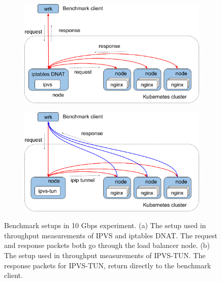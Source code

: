 \begin{figure}[h]
  \begin{subfigure}[t]{\columnwidth}
    \centering
    \includegraphics[width=0.8\columnwidth]{Figs/benchmark-schem-10g-nat}
    \par\bigskip
    \centering
    \begin{minipage}{0.9\columnwidth}
      \caption{}
      \label{fig:benchmark-schem-10g-nat}
    \end{minipage}
  \end{subfigure}

  \begin{subfigure}[t]{\columnwidth}
    \centering
    \includegraphics[width=0.8\columnwidth]{Figs/benchmark-schem-10g-dsr}
    \par\bigskip
    \centering
    \begin{minipage}{0.9\columnwidth}
      \caption{}
      \label{fig:benchmark-schem-10g-dsr}
    \end{minipage}
  \end{subfigure}

  \par\bigskip
  \centering
  \begin{minipage}{0.9\columnwidth}
    \caption[Benchmark setups in 10 Gbps experiment]{
      Benchmark setups in 10 Gbps experiment.
      (a) The setup used in throughput measurements of IPVS and iptables DNAT.
      The request and response packets both go through the load balancer node.
      (b) The setup used in throughput measurements of IPVS-TUN.
      The response packets for IPVS-TUN, return directly to the benchmark client.
    }
    \label{fig:benchmark-schem-10g}
  \end{minipage}
\end{figure}


